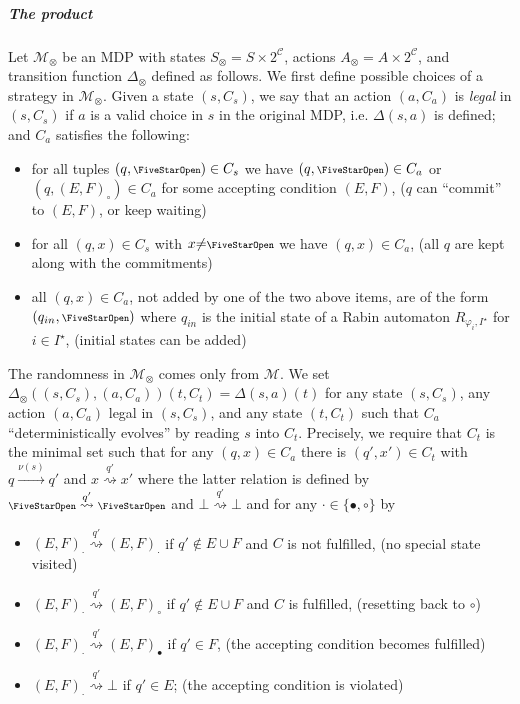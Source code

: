 \documentclass[a4paper,UKenglish]{lipics}
\newcommand{\symbopen}{\text{\scriptsize\FiveStarOpen}}
\newcommand{\tran}[1]{\stackrel{#1}{\rightarrow}}
\newcommand{\mdp}{\mathcal{M}}
\newcommand{\states}{S}
\newcommand{\actions}{A}
\newcommand{\tra}{\Delta}
\newcommand{\fix}[1]{{#1^\star}}
\newcommand{\fixI}{\fix{I}}
\begin{document}
\subparagraph{The product}
Let $\mdp_{\otimes}$ be an MDP with states $\states_\otimes = \states \times 2^{\mathcal{C}}$,
actions
$\actions_\otimes = \actions \times 2^{\mathcal{C}}$, and transition function $\tra_\otimes$ defined as follows.
We first define possible choices of a strategy in $\mdp_\otimes$. Given a state $(s,C_s)$, we say that an action $(a,C_a)$ is \emph{legal} in $(s,C_s)$ if
$a$ is a valid choice in $s$ in the original MDP, i.e. $\tra(s,a)$ is defined; and $C_a$ satisfies the following:
\begin{itemize}
	\item for all tuples $(q,\symbopen)\in C_s$ we have $(q,\symbopen)\in C_a$ or $(q,(E,F)_\circ)\in C_a$ for some accepting condition $(E,F)$,
	{\footnotesize ($q$ can ``commit'' to $(E,F)$, or keep waiting)}
	\item for all $(q,x)\in C_s$ with $x{\neq}\symbopen$ we have $(q,x)\in C_a$, {\footnotesize (all $q$ are kept along with the commitments)}
	\item all $(q,x) \in C_a$, not added by one of the two above items, are of the form $(q_{in}, \symbopen)$ where $q_{in}$ is the initial state of a Rabin automaton $R_{\varphi_i,\fixI}$ for $i\in \fixI$, {\footnotesize (initial states can be added)}
\end{itemize}


\noindent
\label{page:det-evolv}The randomness in $\mdp_\otimes$ comes only from $\mdp$. We set $\tra_\otimes((s,C_s),(a,C_a))(t,C_t) = \tra(s,a)(t)$
for any state $(s,C_s)$, any action $(a,C_a)$ legal in $(s,C_s)$, and any state $(t,C_t)$ such that $C_a$ ``deterministically evolves'' by reading $s$ into $C_t$. 
Precisely, we require that $C_t$ is the minimal set such that for any $(q,x) \in C_a$ there is $(q',x') \in C_t$ with $q \tran{\nu(s)} q'$ and $x \stackrel{q'}{\rightsquigarrow} x'$ where the latter relation is defined by $\symbopen \stackrel{q'}{\rightsquigarrow} \symbopen$ and $\bot \stackrel{q'}{\rightsquigarrow} \bot$  and for any $\cdot \in \{\bullet, \circ\}$ by
\begin{itemize}
	\item $(E,F)_\cdot \stackrel{q'}{\rightsquigarrow} (E,F)_\cdot$ if $q'\not\in E \cup F$ and $C$ is not fulfilled, {\footnotesize (no special state visited)}
	\item $(E,F)_\cdot \stackrel{q'}{\rightsquigarrow} (E,F)_\circ$ if $q'\not\in E \cup F$ and $C$ is fulfilled, {\footnotesize (resetting back to $\circ$)}
	\item $(E,F)_\cdot \stackrel{q'}{\rightsquigarrow} (E,F)_\bullet$  if $q' \in F$, {\footnotesize (the accepting condition becomes fulfilled)} 
	\item $(E,F)_\cdot \stackrel{q'}{\rightsquigarrow} \bot$ if $q' \in E$; {\footnotesize (the accepting condition is violated)} 
\end{itemize}
\end{document}
